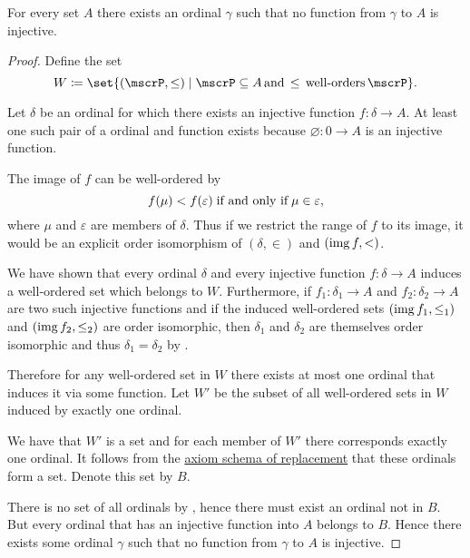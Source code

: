 \begin{theorem}\label{thm:hartogs_lemma}
  For every set \( A \) there exists an ordinal \( \gamma \) such that no function from \( \gamma \) to \( A \) is injective.
\end{theorem}
\begin{proof}
  Define the set
  \begin{equation*}
    W \coloneqq \set{ (\mscrP, \leq) \given \mscrP \subseteq A \T*{and} \leq \T*{well-orders} \mscrP }.
  \end{equation*}

  Let \( \delta \) be an ordinal for which there exists an injective function \( f: \delta \to A \). At least one such pair of a ordinal and function exists because \( \varnothing: 0 \to A \) is an injective function.

  The image of \( f \) can be well-ordered by
  \begin{equation*}
    f(\mu) < f(\varepsilon) \T{if and only if} \mu \in \varepsilon,
  \end{equation*}
  where \( \mu \) and \( \varepsilon \) are members of \( \delta \). Thus if we restrict the range of \( f \) to its image, it would be an explicit order isomorphism of \( (\delta, \in) \) and \( (\operatorname{img} f, <) \).

  We have shown that every ordinal \( \delta \) and every injective function \( f: \delta \to A \) induces a well-ordered set which belongs to \( W \). Furthermore, if \( f_1: \delta_1 \to A \) and \( f_2: \delta_2 \to A \) are two such injective functions and if the induced well-ordered sets \( (\operatorname{img} f_1, \leq_1) \) and \( (\operatorname{img} f_2, \leq_2) \) are order isomorphic, then \( \delta_1 \) and \( \delta_2 \) are themselves order isomorphic and thus \( \delta_1 = \delta_2 \) by .

  Therefore for any well-ordered set in \( W \) there exists at most one ordinal that induces it via some function. Let \( W' \) be the subset of all well-ordered sets in \( W \) induced by exactly one ordinal.

  We have that \( W' \) is a set and for each member of \( W' \) there corresponds exactly one ordinal. It follows from the \hyperref[def:zfc/replacement]{axiom schema of replacement} that these ordinals form a set. Denote this set by \( B \).

  There is no set of all ordinals by , hence there must exist an ordinal not in \( B \). But every ordinal that has an injective function into \( A \) belongs to \( B \). Hence there exists some ordinal \( \gamma \) such that no function from \( \gamma \) to \( A \) is injective.
\end{proof}

